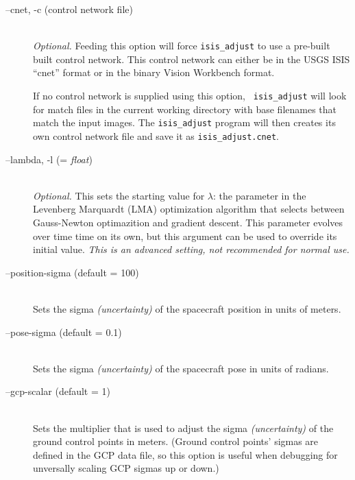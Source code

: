 \begin{description}

\item[--cnet, -c \textnormal{\small{(control network file)}}] \hfill \\

  \emph{Optional.} Feeding this option will force {\tt isis\_adjust} to
  use a pre-built built control network. This control network can
  either be in the USGS ISIS ``cnet'' format or in the binary Vision
  Workbench format. 

  If no control network is supplied using this option, {\tt
    isis\_adjust} will look for match files in the current working
  directory with base filenames that match the input images.  The
  \texttt{isis\_adjust} program will then creates its own control
  network file and save it as \verb=isis_adjust.cnet=.

\item[--lambda, -l \textnormal{\small{(= \emph{float})}}] \hfill \\

  \emph{Optional.} This sets the starting value for $\lambda$: the
  parameter in the Levenberg Marquardt (LMA) optimization algorithm
  that selects between Gauss-Newton optimazition and gradient
  descent. This parameter evolves over time time on its own, but this
  argument can be used to override its initial value. \emph{This is an
    advanced setting, not recommended for normal use.}

\item[--position-sigma \textnormal{\small{(default = 100)}}] \hfill \\

  Sets the sigma \emph{(uncertainty)} of the spacecraft position in
  units of meters.

\item[--pose-sigma \textnormal{\small{(default = 0.1)}}] \hfill \\

  Sets the sigma \emph{(uncertainty)} of the spacecraft pose in units
  of radians.

\item[--gcp-scalar \textnormal{\small{(default = 1)}}] \hfill \\

  Sets the multiplier that is used to adjust the sigma
  \emph{(uncertainty)} of the ground control points in meters. (Ground
  control points' sigmas are defined in the GCP data file, so this
  option is useful when debugging for unversally scaling GCP sigmas up
  or down.)


\end{description}
